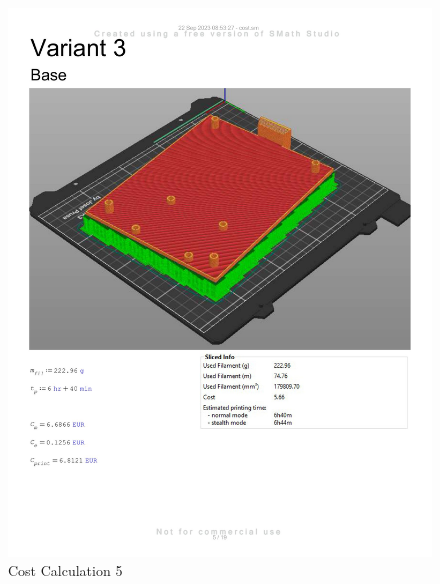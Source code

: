 \begin{figure}[H]
    \centering
    \includegraphics[width=\linewidth]{texs/appendix/data/costcalculation/cost1-05.jpg}
    \caption{Cost Calculation 5}
    \label{fig:cost-calculation-5}
\end{figure}

